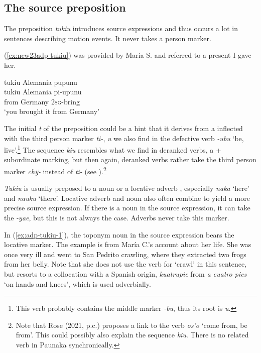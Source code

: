\subsection{The source preposition}\label{sec:adp-tukiu}

The preposition \textit{tukiu} introduces source expressions and thus occurs a lot in sentences describing motion events. It never takes a person marker. 

(\ref{ex:new23adp-tukiu}) was provided by María S. and referred to a present I gave her.

\ea\label{ex:new23adp-tukiu}
\begingl
\glpreamble tukiu Alemania pupunu\\
\gla tukiu Alemania pi-upunu\\
\glb from Germany 2\textsc{sg}-bring\\
\glft ‘you brought it from Germany’
\endgl
\trailingcitation{[rxx-e120511l.016]}
\xe

The initial \textit{t} of the preposition could be a hint that it derives from a  inflected with the third person marker \textit{ti-}, \textit{u} we also find in the defective verb \textit{-ubu} ‘be, live’.\footnote{This verb probably contains the middle marker \textit{-bu}, thus its root is \textit{u}.} The sequence \textit{kiu} resembles what we find in deranked verbs, a  + subordinate marking, but then again, deranked verbs rather take the third person marker \textit{chÿ-} instead of \textit{ti-} (see ).\footnote{Note that Rose (2021, p.c.) proposes a link to the  verb \textit{os’o} ‘come from, be from’. This could possibly also explain the sequence \textit{kiu}. There is no related verb in Paunaka synchronically.}

\textit{Tukiu} is usually preposed to a noun or a locative adverb , especially \textit{naka} ‘here’ and \textit{nauku} ‘there’. Locative adverb and noun also often combine to yield a more precise source expression. If there is a noun in the source expression, it can take the  \textit{-yae}, but this is not always the case. Adverbs never take this marker.

In (\ref{ex:adp-tukiu-1}), the toponym noun in the source expression bears the locative marker. The example is from María C.’s account about her life. She was once very ill and went to San Pedrito crawling, where they extracted two frogs from her belly. Note that she does not use the verb for ‘crawl’ in this sentence, but resorts to a collocation with a Spanish origin, \textit{kuatrupie} from \textit{a cuatro pies} ‘on hands and knees’, which is used adverbially.

